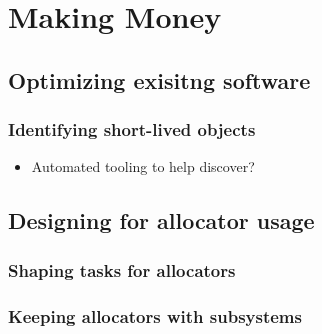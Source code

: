 \chapter{Making Money}

\section{Optimizing exisitng software}

\subsection{Identifying short-lived objects}

\begin{itemize}
\item Automated tooling to help discover?
\end{itemize}

\section{Designing for allocator usage}

\subsection{Shaping tasks for allocators}

\subsection{Keeping allocators with subsystems}
  
